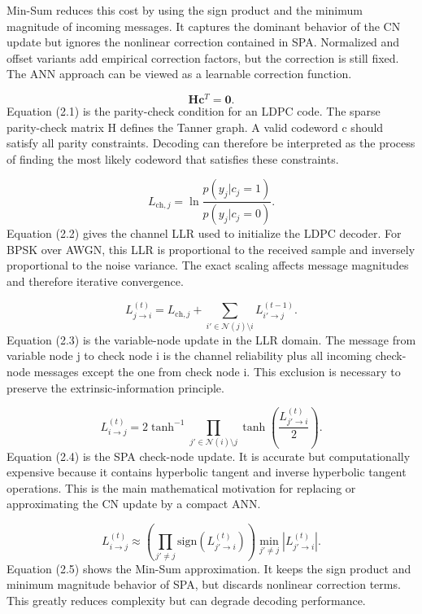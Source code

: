 Min-Sum reduces this cost by using the sign product and the minimum magnitude of incoming messages. It captures the dominant behavior of the CN update but ignores the nonlinear correction contained in SPA. Normalized and offset variants add empirical correction factors, but the correction is still fixed. The ANN approach can be viewed as a learnable correction function.

\begin{equation}
\mathbf{H}\mathbf{c}^{T}=\mathbf{0}.
\end{equation}
Equation (2.1) is the parity-check condition for an LDPC code. The sparse parity-check matrix H defines the Tanner graph. A valid codeword c should satisfy all parity constraints. Decoding can therefore be interpreted as the process of finding the most likely codeword that satisfies these constraints.

\begin{equation}
L_{\mathrm{ch},j}=\ln\frac{p(y_j|c_j=1)}{p(y_j|c_j=0)}.
\end{equation}
Equation (2.2) gives the channel LLR used to initialize the LDPC decoder. For BPSK over AWGN, this LLR is proportional to the received sample and inversely proportional to the noise variance. The exact scaling affects message magnitudes and therefore iterative convergence.

\begin{equation}
L_{j\rightarrow i}^{(t)}=L_{\mathrm{ch},j}+\sum_{i'\in\mathcal{N}(j)\setminus i}L_{i'\rightarrow j}^{(t-1)}.
\end{equation}
Equation (2.3) is the variable-node update in the LLR domain. The message from variable node j to check node i is the channel reliability plus all incoming check-node messages except the one from check node i. This exclusion is necessary to preserve the extrinsic-information principle.

\begin{equation}
L_{i\rightarrow j}^{(t)}=
2\tanh^{-1}\!\prod_{j'\in\mathcal{N}(i)\setminus j}\tanh\!\left(\frac{L_{j'\rightarrow i}^{(t)}}{2}\right).
\end{equation}
Equation (2.4) is the SPA check-node update. It is accurate but computationally expensive because it contains hyperbolic tangent and inverse hyperbolic tangent operations. This is the main mathematical motivation for replacing or approximating the CN update by a compact ANN.

\begin{equation}
L_{i\rightarrow j}^{(t)}\approx
\left(\prod_{j'\ne j}\mathrm{sign}(L_{j'\rightarrow i}^{(t)})\right)
\min_{j'\ne j}|L_{j'\rightarrow i}^{(t)}|.
\end{equation}
Equation (2.5) shows the Min-Sum approximation. It keeps the sign product and minimum magnitude behavior of SPA, but discards nonlinear correction terms. This greatly reduces complexity but can degrade decoding performance.

